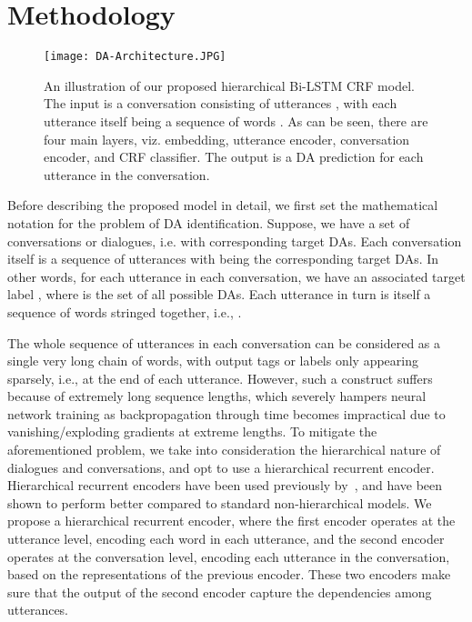 \documentclass[letterpaper]{article} \usepackage{aaai18}
\begin{document}
 \section{Methodology}
\label{sec:method}
\begin{figure*}[!htb]
	\begin{center}
\texttt{[image: DA-Architecture.JPG]}
      \caption{\small An illustration of our proposed hierarchical Bi-LSTM CRF model. The input is a conversation  consisting of  utterances , with each utterance  itself being a sequence of words . As can be seen, there are four main layers, viz. embedding, utterance encoder, conversation encoder, and CRF classifier. The output is a DA prediction for each utterance in the conversation.}
    \label{fig:model}
    \end{center}
\end{figure*}
Before describing the proposed model in detail, we first set the mathematical notation for the problem of DA identification. Suppose, we have a set  of  conversations or dialogues, i.e.  with  corresponding target DAs. Each conversation  itself is a sequence of  utterances  with  being the corresponding target DAs. In other words, for each utterance  in each conversation, we have an associated target label , where  is the set of all possible DAs. Each utterance  in turn is itself a sequence of  words stringed together, i.e., . 

The whole sequence of utterances in each conversation can be considered as a single very long chain of words, with output tags or labels only appearing sparsely, i.e., at the end of each utterance. However, such a construct suffers because of extremely long sequence lengths, which severely hampers neural network training as backpropagation through time becomes impractical due to vanishing/exploding gradients at extreme lengths. To mitigate the aforementioned problem, we take into consideration the hierarchical nature of dialogues and conversations, and opt to use a hierarchical recurrent encoder. Hierarchical recurrent encoders have been used previously by~\cite{Sordoni2015,Serban2016,Serban2017,Dehghani2017}, and have been shown to perform better compared to standard non-hierarchical models. We propose a hierarchical recurrent encoder, where the first encoder operates at the utterance level, encoding each word in each utterance, and the second encoder operates at the conversation level, encoding each utterance in the conversation, based on the representations of the previous encoder. These two encoders make sure that the output of the second encoder capture the dependencies among utterances. 
\end{document}
